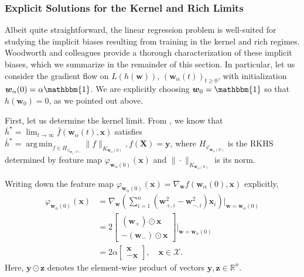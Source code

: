 \documentclass{article}
\DeclareMathOperator*{\argmin}{arg\,min}
\begin{document}
\subsubsection{Explicit Solutions for the Kernel and Rich Limits}\label{richkerneltheory}
Albeit quite straightforward, the linear regression problem is well-suited for studying the implicit biases resulting from training in the kernel and rich regimes. Woodworth and colleagues provide a thorough characterization of these implicit biases, which we summarize in the remainder of this section. In particular, let us consider the gradient flow on $L(h(\boldsymbol{w}))$, $(\boldsymbol{w}_{\alpha}(t))_{t \geq 0}$, with initialization $\boldsymbol{w}_{\alpha}(0) = \alpha \mathbbm{1}$. We are explicitly choosing $\boldsymbol{w}_0 = \mathbbm{1}$ so that $h(\boldsymbol{w}_0) = 0$, as we pointed out above.

First, let us determine the kernel limit. From \cite{woodworth2020kernel}, we know that $\bar{h}^{\star} = \lim_{t \to \infty} \bar{f}(\boldsymbol{w}_{\alpha}(t), \boldsymbol{x})$ satisfies $\bar{h}^{\star} = \argmin_{f \in H_{\varphi_{\boldsymbol{w}_{\alpha}(0)}}} \| f \|_{K_{\boldsymbol{w}_{\alpha}(0)}}, f(\boldsymbol{X}) = \boldsymbol{y}$, where $H_{\varphi_{\boldsymbol{w}_{\alpha}(0)}}$ is the RKHS determined by feature map $\varphi_{\boldsymbol{w}_{\alpha}(0)}(\boldsymbol{x})$ and $\| \cdot \|_{K_{\boldsymbol{w}_{\alpha}(0)}}$ is its norm. 

Writing down the feature map $\varphi_{\boldsymbol{w}_{\alpha}(0)}(\boldsymbol{x}) = \nabla_{\boldsymbol{w}} f(\boldsymbol{w}_{\alpha}(0), \boldsymbol{x})$ explicitly, 
\begin{align*}
    \varphi_{\boldsymbol{w}_{\alpha}(0)}(\boldsymbol{x}) &= \nabla_{\boldsymbol{w}}\left( \sum_{i=1}^n(\boldsymbol{w}_{+, i}^2 - \boldsymbol{w}_{-, i}^2)\boldsymbol{x}_i \right)\bigg|_{\boldsymbol{w} = \boldsymbol{w}_{\alpha}(0)}\\
    &= 2\begin{bmatrix}
        (\boldsymbol{w}_+) \odot \boldsymbol{x}\\
        -(\boldsymbol{w}_-) \odot \boldsymbol{x}
    \end{bmatrix} \bigg|_{\boldsymbol{w} = \boldsymbol{w}_{\alpha}(0)}\\
    &= 2\alpha \begin{bmatrix}
        \boldsymbol{x}\\
        -\boldsymbol{x}
    \end{bmatrix}, \quad \boldsymbol{x} \in \mathcal{X}.
\end{align*}
Here, $\boldsymbol{y} \odot \boldsymbol{z}$ denotes the element-wise product of vectors $\boldsymbol{y}, \boldsymbol{z} \in \mathbb{R}^n$. 
\end{document}
